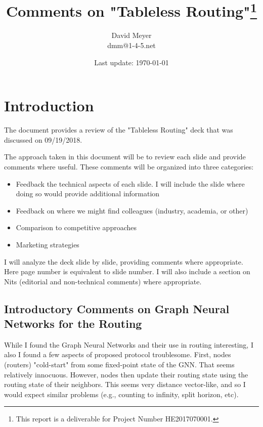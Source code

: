 \documentclass[11pt, oneside]{article}   	%
\title{Comments on "Tableless Routing"\footnote{This report is a deliverable for Project Number HE2017070001.}}
\author{David Meyer \\
dmm@1-4-5.net}
\date{Last update: \today}							%
\begin{document}
\maketitle

\section{Introduction} 
\label{sec:intro}
The document provides a review of the "Tableless Routing" deck that was discussed on 09/19/2018. 

\bigskip
\noindent
The approach taken in this document will be to review each slide and provide comments where useful. 
These comments will be organized into three categories: 

\begin{itemize}
\item Feedback the technical aspects of each slide. I will include the slide where doing so would provide additional information
\item Feedback  on where we might find colleagues (industry, academia, or other)
\item Comparison to competitive approaches
\item Marketing strategies
\end{itemize}

\bigskip
\noindent
I will analyze the deck slide by slide, providing comments where appropriate. Here page number is equivalent 
to slide number. I will also include a section on Nits (editorial and non-technical comments) where appropriate.

\subsection{Introductory Comments on Graph Neural Networks for the Routing}
\label{subsec:gnn}
While I found the Graph Neural Networks and their use in routing  \cite{Scarselli:2009:GNN:1657477.1657482,DBLP:conf/sigcomm/GeyerC18}  interesting, I also  I found a few aspects of proposed 
protocol troublesome. First, nodes (routers) "cold-start" from some fixed-point state of the GNN. That seems relatively innocuous. However, nodes then update their routing state using the routing 
state of their neighbors. This seems very distance vector-like, and so I would expect similar problems (e.g., counting to infinity, split horizon, etc). 
\end{document}
